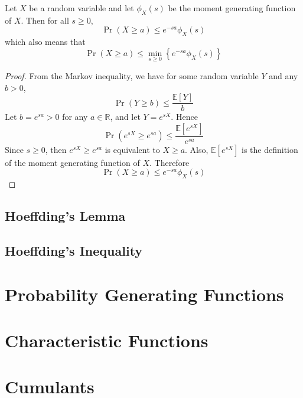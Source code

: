 \documentclass[11pt]{report} %
\begin{document}
Let $X$ be a random variable and let $\phi_{X}\left(s\right)$ be the moment generating function of $X$. Then for all $s\geq 0$, 
\begin{equation}
\operatorname{Pr}\left(X \geq a\right) \leq e^{-sa}\phi_{X}\left(s\right)
\end{equation}
which also means that 
\begin{equation}
\operatorname{Pr}\left(X \geq a\right) \leq \min_{s\geq 0}\left\{e^{-sa}\phi_{X}\left(s\right)\right\}
\end{equation}
\begin{proof}
From the Markov inequality, we have for some random variable $Y$ and any $b > 0$, 
\begin{equation}
\operatorname{Pr}\left(Y \geq b\right) \leq \dfrac{\mathbb{E}\left[Y\right]}{b}
\end{equation}
Let $b = e^{sa} > 0$ for any $a\in\mathbb{R}$, and let $Y = e^{sX}$. Hence
\begin{equation}
\operatorname{Pr}\left(e^{sX} \geq e^{sa}\right) \leq \dfrac{\mathbb{E}\left[e^{sX}\right]}{e^{sa}}
\end{equation}
Since $s\geq 0$, then $e^{sX} \geq e^{sa}$ is equivalent to $X \geq a$. Also, $\mathbb{E}\left[e^{sX}\right]$ is the definition of the moment generating function of $X$. Therefore
\begin{equation}
\operatorname{Pr}\left(X \geq a\right) \leq e^{-sa}\phi_{X}\left(s\right)
\end{equation}
\end{proof}

\subsection{Hoeffding's Lemma}

\subsection{Hoeffding's Inequality}

\section{Probability Generating Functions}

\section{Characteristic Functions}

\section{Cumulants}
\end{document}
